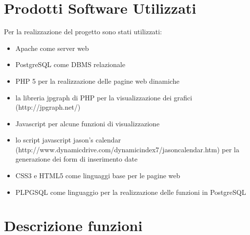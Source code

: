 \documentclass[a4paper,10pt]{article}
\begin{document}
\section{Prodotti Software Utilizzati}
Per la realizzazione del progetto sono stati utilizzati:
\begin{itemize}
\item Apache come server web
\item PostgreSQL come DBMS relazionale
\item PHP 5 per la realizzazione delle pagine web dinamiche
\item la libreria jpgraph di PHP per la visualizzazione dei grafici (http://jpgraph.net/)
\item Javascript per alcune funzioni di visualizzazione
\item lo script javascript jason's calendar (http://www.dynamicdrive.com/dynamicindex7/jasoncalendar.htm) per la generazione dei form di inserimento date
\item CSS3 e HTML5 come linguaggi base per le pagine web
\item PLPGSQL come linguaggio per la realizzazione delle funzioni in PostgreSQL
\end{itemize}

\section{Descrizione funzioni}
\end{document}
